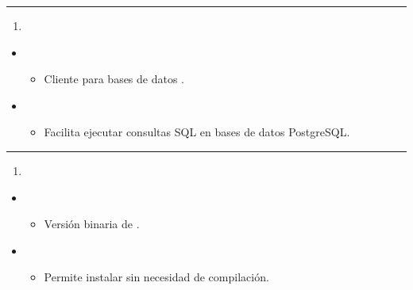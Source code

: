 \documentclass[a4paper,10pt,oneside,spanish,openany]{sphinxmanual}
\begin{document}
\bigskip\hrule\bigskip

\begin{enumerate}
%
\setcounter{enumi}{18}
\item {} 
\sphinxAtStartPar
{}

\end{enumerate}
\begin{itemize}
\item {} 
\sphinxAtStartPar
{}
\begin{itemize}
\item {} 
\sphinxAtStartPar
Cliente para bases de datos .

\end{itemize}

\item {} 
\sphinxAtStartPar
{}
\begin{itemize}
\item {} 
\sphinxAtStartPar
Facilita ejecutar consultas SQL en bases de datos PostgreSQL.

\end{itemize}

\end{itemize}


\bigskip\hrule\bigskip

\begin{enumerate}
%
\setcounter{enumi}{19}
\item {} 
\sphinxAtStartPar
{}

\end{enumerate}
\begin{itemize}
\item {} 
\sphinxAtStartPar
{}
\begin{itemize}
\item {} 
\sphinxAtStartPar
Versión binaria de .

\end{itemize}

\item {} 
\sphinxAtStartPar
{}
\begin{itemize}
\item {} 
\sphinxAtStartPar
Permite instalar  sin necesidad de compilación.

\end{itemize}

\end{itemize}
\end{document}
